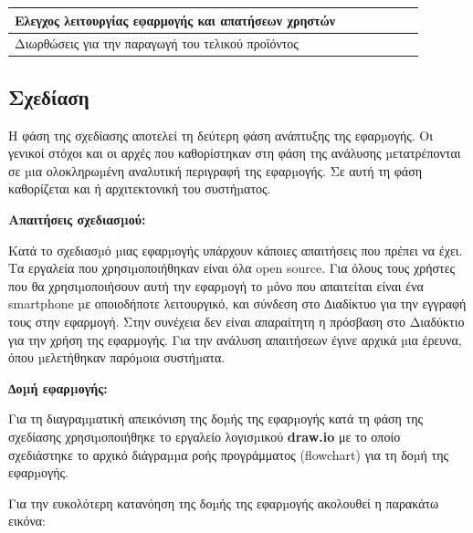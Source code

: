\documentclass[a4paper,12pt]{article}
\begin{document}
\begin{table}[htb]
{{\begin{tabular}{|l|l|l|l|l|l|l|}
			Ελεγχος λειτουργίας εφαρμογής και απατήσεων χρηστών &                          &                          &                          &                          &                          & \cellcolor[HTML]{D14A47} \\ \hline
			Διωρθώσεις για την παραγωγή του τελικού προϊόντος   &                          &                          &                          &                          &                          & \cellcolor[HTML]{D14A47} \\ \hline
			\end{tabular}%
			}
			}
		\end{table}
		\newpage
		\subsection{Σχεδίαση}
		Η φάση της σχεδίασης αποτελεί τη δεύτερη φάση ανάπτυξης της εφαρµογής. Οι
		γενικοί στόχοι και οι αρχές που καθορίστηκαν στη φάση της ανάλυσης µετατρέπονται
		σε µια ολοκληρωµένη αναλυτική περιγραφή της εφαρµογής. Σε αυτή τη φάση
		καθορίζεται και ή αρχιτεκτονική του συστήµατος.

		\textbf{Απαιτήσεις σχεδιασµού:}

		Κατά το σχεδιασµό µιας εφαρµογής υπάρχουν κάποιες απαιτήσεις που πρέπει να
		έχει. Τα εργαλεία που χρησιµοποιήθηκαν είναι όλα open source. Για όλους τους
		χρήστες που θα χρησιµοποιήσουν αυτή την εφαρµογή το µόνο που απαιτείται είναι
		ένα smartphone µε οποιοδήποτε λειτουργικό, και σύνδεση στο ∆ιαδίκτυο για την 
		εγγραφή τους στην εφαρμογή. Στην συνέχεια δεν είναι απαραίτητη η πρόσβαση στο
		Διαδύκτιο για την χρήση της εφαρμογής. 
		Για την ανάλυση απαιτήσεων έγινε αρχικά µια
		έρευνα, όπου µελετήθηκαν παρόµοια συστήµατα.

		\textbf{∆οµή εφαρµογής:}

 		Για τη διαγραµµατική απεικόνιση της δοµής της εφαρµογής κατά τη φάση της
		σχεδίασης χρησιµοποιήθηκε το εργαλείο λογισµικού \textbf{draw.io} με το οποίο
		σχεδιάστηκε το αρχικό διάγραµµα ροής προγράμματος (flowchart) για τη δοµή της εφαρµογής. 
		
		Για την ευκολότερη κατανόηση της δοµής της εφαρµογής ακολουθεί η παρακάτω εικόνα:
\end{document}
